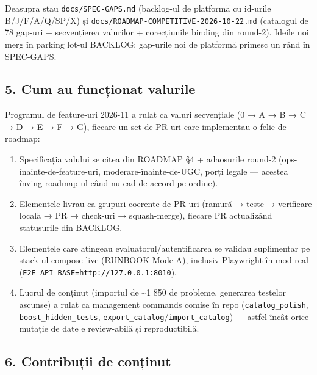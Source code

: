 \documentclass[
]{article}
\providecommand{\tightlist}{%
  \setlength{\itemsep}{0pt}\setlength{\parskip}{0pt}}
\begin{document}
Deasupra stau \texttt{docs/SPEC-GAPS.md} (backlog-ul de platformă cu
id-urile B/J/F/A/Q/SP/X) și
\texttt{docs/ROADMAP-COMPETITIVE-2026-10-22.md} (catalogul de 78 gap-uri
+ secvențierea valurilor + corecțiunile binding din round-2). Ideile noi
merg în parking lot-ul BACKLOG; gap-urile noi de platformă primesc un
rând în SPEC-GAPS.

\subsection{5. Cum au funcționat
valurile}\label{5-cum-au-funcux21bionat-valurile}

Programul de feature-uri 2026-11 a rulat ca valuri secvențiale (0 → A →
B → C → D → E → F → G), fiecare un set de PR-uri care implementau o
felie de roadmap:

\begin{enumerate}
\def\labelenumi{\arabic{enumi}.}
\tightlist
\item
  Specificația valului se citea din ROADMAP §4 + adaosurile round-2
  (ops-înainte-de-feature-uri, moderare-înainte-de-UGC, porți legale ---
  acestea înving roadmap-ul când nu cad de accord pe ordine).
\item
  Elementele livrau ca grupuri coerente de PR-uri (ramură → teste →
  verificare locală → PR → check-uri → squash-merge), fiecare PR
  actualizând statusurile din BACKLOG.
\item
  Elementele care atingeau evaluatorul/autentificarea se validau
  suplimentar pe stack-ul compose live (RUNBOOK Mode A), inclusiv
  Playwright în mod real
  (\texttt{E2E\_API\_BASE=http://127.0.0.1:8010}).
\item
  Lucrul de conținut (importul de \textasciitilde1 850 de probleme,
  generarea testelor ascunse) a rulat ca management commands comise în
  repo (\texttt{catalog\_polish}, \texttt{boost\_hidden\_tests},
  \texttt{export\_catalog}/\texttt{import\_catalog}) --- astfel încât
  orice mutație de date e review-abilă și reproductibilă.
\end{enumerate}

\subsection{6. Contribuții de
conținut}\label{6-contribuux21bii-de-conux21binut}
\end{document}
